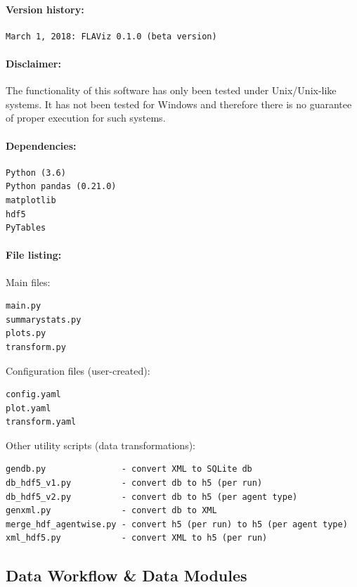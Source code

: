 \documentclass[10pt,a4paper]{article}
\begin{document}
\paragraph{Version history:}
\begin{verbatim}
March 1, 2018: FLAViz 0.1.0 (beta version)
\end{verbatim}


\paragraph{Disclaimer:} The functionality of this software has only been tested under Unix/Unix-like systems. It has not been tested for Windows and therefore there is no guarantee of proper execution for such systems.

\paragraph{Dependencies:}

\begin{verbatim}
Python (3.6)
Python pandas (0.21.0)
matplotlib
hdf5
PyTables
\end{verbatim}

\paragraph{File listing:}

\smallskip
Main files:
\begin{verbatim}
main.py
summarystats.py
plots.py
transform.py
\end{verbatim}

Configuration files (user-created):
\begin{verbatim}
config.yaml
plot.yaml
transform.yaml
\end{verbatim}

Other utility scripts (data transformations):
\begin{verbatim}
gendb.py               - convert XML to SQLite db
db_hdf5_v1.py          - convert db to h5 (per run)
db_hdf5_v2.py          - convert db to h5 (per agent type)
genxml.py              - convert db to XML
merge_hdf_agentwise.py - convert h5 (per run) to h5 (per agent type)
xml_hdf5.py            - convert XML to h5 (per run)
\end{verbatim}


\subsection{Data Workflow \& Data Modules}
\end{document}
